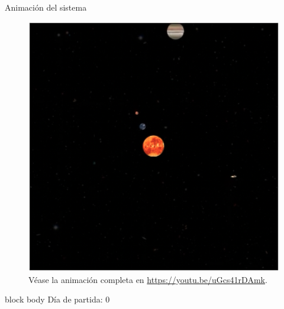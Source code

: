 \documentclass{beamer}
\begin{document}
            \begin{frame}{Animación del sistema}{}
                \vspace*{-0.3cm}
                \begin{minipage}[t]{0.49\textwidth}
                    \begin{figure}[H!]
                        \includegraphics[width=\textwidth]{./animacion_jupiter_1}
                        \caption*{Véase la animación completa en \url{https://youtu.be/uGcs41rDAmk}.}
                        \label{fig:jupiter_1}
                    \end{figure}
                    \vspace*{-0.5cm}
                    \begin{beamercolorbox}[sep=5pt,center]{block body}
                        \centering
                        \small{Día de partida: 0}
                    \end{beamercolorbox}
                \end{minipage}
                \hfill
                \begin{minipage}[t]{0.49\textwidth}
                    \begin{figure}[H!]

\end{figure}
\end{minipage}
\end{frame}
\end{document}
